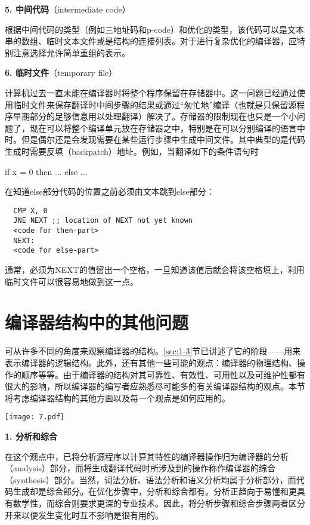 \documentclass[lang=cn,10pt]{elegantbook}
\begin{document}
\textbf{5. 中间代码}（intermediate code）

根据中间代码的类型（例如三地址码和p-code）和优化的类型，该代码可以是文本串的数组、临时文本文件或是结构的连接列表。对于进行复杂优化的编译器，应特别注意选择允许简单重组的表示。

\textbf{6. 临时文件}（temporary file）

计算机过去一直未能在编译器时将整个程序保留在存储器中。这一问题已经通过使用临时文件来保存翻译时中间步骤的结果或通过“匆忙地”编译（也就是只保留源程序早期部分的足够信息用以处理翻译）解决了。存储器的限制现在也只是一个小问题了，现在可以将整个编译单元放在存储器之中，特别是在可以分别编译的语言中时。但是偶尔还是会发现需要在某些运行步骤中生成中间文件。其中典型的是代码生成时需要反填（backpatch）地址。例如，当翻译如下的条件语句时

if x = 0 then ... else ...

在知道else部分代码的位置之前必须由文本跳到else部分：

\begin{lstlisting}
  CMP X, 0
  JNE NEXT ;; location of NEXT not yet known
  <code for then-part>
  NEXT:
  <code for else-part>
\end{lstlisting}

通常，必须为NEXT的值留出一个空格，一旦知道该值后就会将该空格填上，利用临时文件可以很容易地做到这一点。

\section{编译器结构中的其他问题}
\label{sec:1-5}

可从许多不同的角度来观察编译器的结构。\ref{sec:1-3}节已讲述了它的阶段——用来表示编译器的逻辑结构。此外，还有其他一些可能的观点：编译器的物理结构、操作的顺序等等。由于编译器的结构对其可靠性、有效性、可用性以及可维护性都有很大的影响，所以编译器的编写者应熟悉尽可能多的有关编译器结构的观点。本节将考虑编译器结构的其他方面以及每一个观点是如何应用的。

\begin{center}
  \texttt{[image: 7.pdf]}
\end{center}

\textbf{1. 分析和综合}

在这个观点中，已将分析源程序以计算其特性的编译器操作归为编译器的分析（analysis）部分，而将生成翻译代码时所涉及到的操作称作编译器的综合（synthesis）部分。当然，词法分析、语法分析和语义分析均属于分析部分，而代码生成却是综合部分。在优化步骤中，分析和综合都有。分析正趋向于易懂和更具有数学性，而综合则要求更深的专业技术。因此，将分析步骤和综合步骤两者区分开来以便发生变化时互不影响是很有用的。
\end{document}
